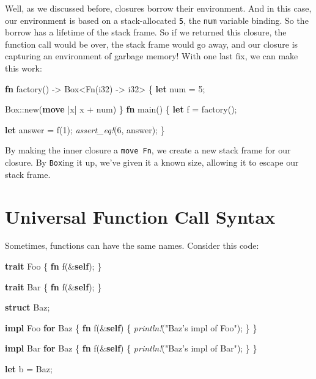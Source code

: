 \documentclass[a4paper,]{book}
\newenvironment{Shaded}{\begin{snugshade}}{\end{snugshade}}
\newcommand{\KeywordTok}[1]{\textcolor[rgb]{0.13,0.29,0.53}{\textbf{{#1}}}}
\newcommand{\DataTypeTok}[1]{\textcolor[rgb]{0.13,0.29,0.53}{{#1}}}
\newcommand{\DecValTok}[1]{\textcolor[rgb]{0.00,0.00,0.81}{{#1}}}
\newcommand{\StringTok}[1]{\textcolor[rgb]{0.31,0.60,0.02}{{#1}}}
\newcommand{\BuiltInTok}[1]{{#1}}
\newcommand{\PreprocessorTok}[1]{\textcolor[rgb]{0.56,0.35,0.01}{\textit{{#1}}}}
\newcommand{\NormalTok}[1]{{#1}}
\begin{document}
Well, as we discussed before, closures borrow their environment. And in
this case, our environment is based on a stack-allocated \texttt{5}, the
\texttt{num} variable binding. So the borrow has a lifetime of the stack
frame. So if we returned this closure, the function call would be over,
the stack frame would go away, and our closure is capturing an
environment of garbage memory! With one last fix, we can make this work:

\begin{Shaded}
\begin{Highlighting}[]
\KeywordTok{fn} \NormalTok{factory() -> }\DataTypeTok{Box}\NormalTok{<}\BuiltInTok{Fn}\NormalTok{(}\DataTypeTok{i32}\NormalTok{) -> }\DataTypeTok{i32}\NormalTok{> \{}
    \KeywordTok{let} \NormalTok{num = }\DecValTok{5}\NormalTok{;}

    \DataTypeTok{Box}\NormalTok{::new(}\KeywordTok{move} \NormalTok{|x| x + num)}
\NormalTok{\}}
\KeywordTok{fn} \NormalTok{main() \{}
\KeywordTok{let} \NormalTok{f = factory();}

\KeywordTok{let} \NormalTok{answer = f(}\DecValTok{1}\NormalTok{);}
\PreprocessorTok{assert_eq!}\NormalTok{(}\DecValTok{6}\NormalTok{, answer);}
\NormalTok{\}}
\end{Highlighting}
\end{Shaded}

By making the inner closure a \texttt{move\ Fn}, we create a new stack
frame for our closure. By \texttt{Box}ing it up, we've given it a known
size, allowing it to escape our stack frame.

\hypertarget{sec--ufcs}{\section{Universal Function Call
Syntax}\label{sec--ufcs}}

Sometimes, functions can have the same names. Consider this code:

\begin{Shaded}
\begin{Highlighting}[]
\KeywordTok{trait} \NormalTok{Foo \{}
    \KeywordTok{fn} \NormalTok{f(&}\KeywordTok{self}\NormalTok{);}
\NormalTok{\}}

\KeywordTok{trait} \NormalTok{Bar \{}
    \KeywordTok{fn} \NormalTok{f(&}\KeywordTok{self}\NormalTok{);}
\NormalTok{\}}

\KeywordTok{struct} \NormalTok{Baz;}

\KeywordTok{impl} \NormalTok{Foo }\KeywordTok{for} \NormalTok{Baz \{}
    \KeywordTok{fn} \NormalTok{f(&}\KeywordTok{self}\NormalTok{) \{ }\PreprocessorTok{println!}\NormalTok{(}\StringTok{"Baz’s impl of Foo"}\NormalTok{); \}}
\NormalTok{\}}

\KeywordTok{impl} \NormalTok{Bar }\KeywordTok{for} \NormalTok{Baz \{}
    \KeywordTok{fn} \NormalTok{f(&}\KeywordTok{self}\NormalTok{) \{ }\PreprocessorTok{println!}\NormalTok{(}\StringTok{"Baz’s impl of Bar"}\NormalTok{); \}}
\NormalTok{\}}

\KeywordTok{let} \NormalTok{b = Baz;}
\end{Highlighting}
\end{Shaded}
\end{document}
